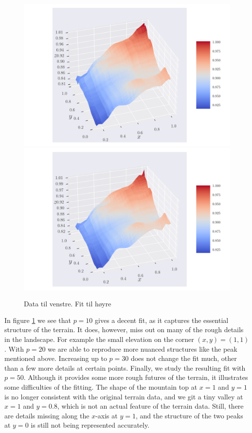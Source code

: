 \documentclass[reprint,english,notitlepage,aps,nobalancelastpage,nofootinbib]{revtex4-1}  %
\begin{document}
\begin{figure}[H]
	\includegraphics[width=\linewidth]{SRTM_prediction_p30.pdf}
	\endminipage\hfill
	\includegraphics[width=\linewidth]{SRTM_prediction_p50.pdf}
	\endminipage
	\caption{Data til venstre. Fit til høyre}
  \label{fig:terrain_fit}
\end{figure}

In figure \ref{fig:terrain_fit} we see that $p=10$ gives a decent fit, as it captures the essential structure of the terrain. It does, however, miss out on many of the rough details in the landscape. For example the small elevation on the corner $(x,y) = (1,1)$. With $p=20$ we are able to reproduce more nuanced structures like the peak mentioned above. Increasing up to $p=30$ does not change the fit much, other than a few more details at certain points. Finally, we study the resulting fit with $p=50$. Although it provides some more rough futures of the terrain, it illustrates some difficulties of the fitting. The shape of the mountain top at $x=1$ and $y=1$ is no longer consistent with the original terrain data, and we git a tiny valley at $x=1$ and $y=0.8$, which is not an actual feature of the terrain data. Still, there are details missing along the $x$-axis at $y=1$, and the structure of the two peaks at $y=0$ is still not being represented accurately.
\end{document}

